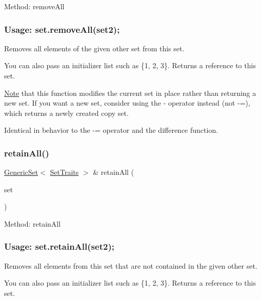 Method\+: remove\+All \subsubsection*{Usage\+: set.\+remove\+All(set2); }

Removes all elements of the given other set from this set. 

You can also pass an initializer list such as \{1, 2, 3\}. Returns a reference to this set.

\mbox{\hyperlink{classNote}{Note}} that this function modifies the current set in place rather than returning a new set. If you want a new set, consider using the -\/ operator instead (not -\/=), which returns a newly created copy set.

Identical in behavior to the -\/= operator and the difference function. \mbox{\label{classstanfordcpplib_1_1collections_1_1GenericSet_a15b39be914ac3e2ecb6f0d14ab893f9a}} 
\subsubsection{\texorpdfstring{retain\+All()}{retainAll()}}
{\footnotesize\ttfamily \mbox{\hyperlink{classstanfordcpplib_1_1collections_1_1GenericSet}{Generic\+Set}}$<$ \mbox{\hyperlink{structstanfordcpplib_1_1collections_1_1SetTraits}{Set\+Traits}} $>$ \& retain\+All (\begin{DoxyParamCaption}\item[{const \mbox{\hyperlink{classstanfordcpplib_1_1collections_1_1GenericSet}{Generic\+Set}}$<$ \mbox{\hyperlink{structstanfordcpplib_1_1collections_1_1SetTraits}{Set\+Traits}} $>$ \&}]{set }\end{DoxyParamCaption})}



Method\+: retain\+All \subsubsection*{Usage\+: set.\+retain\+All(set2); }

Removes all elements from this set that are not contained in the given other set. 

You can also pass an initializer list such as \{1, 2, 3\}. Returns a reference to this set.

